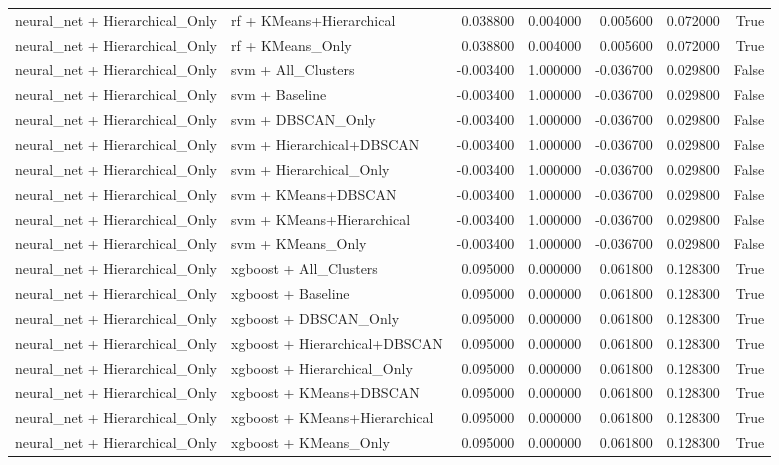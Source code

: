 \begin{tabular}{llrrrrr}
neural_net + Hierarchical_Only & rf + KMeans+Hierarchical & 0.038800 & 0.004000 & 0.005600 & 0.072000 & True \\
neural_net + Hierarchical_Only & rf + KMeans_Only & 0.038800 & 0.004000 & 0.005600 & 0.072000 & True \\
neural_net + Hierarchical_Only & svm + All_Clusters & -0.003400 & 1.000000 & -0.036700 & 0.029800 & False \\
neural_net + Hierarchical_Only & svm + Baseline & -0.003400 & 1.000000 & -0.036700 & 0.029800 & False \\
neural_net + Hierarchical_Only & svm + DBSCAN_Only & -0.003400 & 1.000000 & -0.036700 & 0.029800 & False \\
neural_net + Hierarchical_Only & svm + Hierarchical+DBSCAN & -0.003400 & 1.000000 & -0.036700 & 0.029800 & False \\
neural_net + Hierarchical_Only & svm + Hierarchical_Only & -0.003400 & 1.000000 & -0.036700 & 0.029800 & False \\
neural_net + Hierarchical_Only & svm + KMeans+DBSCAN & -0.003400 & 1.000000 & -0.036700 & 0.029800 & False \\
neural_net + Hierarchical_Only & svm + KMeans+Hierarchical & -0.003400 & 1.000000 & -0.036700 & 0.029800 & False \\
neural_net + Hierarchical_Only & svm + KMeans_Only & -0.003400 & 1.000000 & -0.036700 & 0.029800 & False \\
neural_net + Hierarchical_Only & xgboost + All_Clusters & 0.095000 & 0.000000 & 0.061800 & 0.128300 & True \\
neural_net + Hierarchical_Only & xgboost + Baseline & 0.095000 & 0.000000 & 0.061800 & 0.128300 & True \\
neural_net + Hierarchical_Only & xgboost + DBSCAN_Only & 0.095000 & 0.000000 & 0.061800 & 0.128300 & True \\
neural_net + Hierarchical_Only & xgboost + Hierarchical+DBSCAN & 0.095000 & 0.000000 & 0.061800 & 0.128300 & True \\
neural_net + Hierarchical_Only & xgboost + Hierarchical_Only & 0.095000 & 0.000000 & 0.061800 & 0.128300 & True \\
neural_net + Hierarchical_Only & xgboost + KMeans+DBSCAN & 0.095000 & 0.000000 & 0.061800 & 0.128300 & True \\
neural_net + Hierarchical_Only & xgboost + KMeans+Hierarchical & 0.095000 & 0.000000 & 0.061800 & 0.128300 & True \\
neural_net + Hierarchical_Only & xgboost + KMeans_Only & 0.095000 & 0.000000 & 0.061800 & 0.128300 & True \\

\end{tabular}
